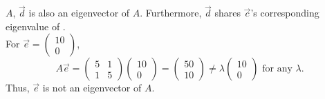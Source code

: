 \documentclass[12pt]{article}
\begin{document}
\begin{enumerate}[label=(\alph*)]
	$A$, $\vec{d}$ is also an eigenvector of $A$. Furthermore, $\vec{d}$
	shares $\vec{c}$'s corresponding eigenvalue of .
	\\[\baselineskip]
	For $\vec{e} = \begin{pmatrix} 10 \\ 0 \end{pmatrix}$,
	\begin{equation*}
		A \vec{e}
		=
		\begin{pmatrix} 5 & 1 \\ 1 & 5 \end{pmatrix}
		\begin{pmatrix} 10 \\ 0 \end{pmatrix}
		=
		\begin{pmatrix} 50 \\ 10 \end{pmatrix}
		\neq
		\lambda
		\begin{pmatrix} 10 \\ 0 \end{pmatrix}
		\text{ for any $\lambda$.}
	\end{equation*}
	Thus, $\vec{e}$ is not an eigenvector of $A$.
	

\end{enumerate}
\end{document}
